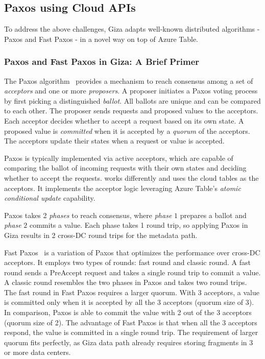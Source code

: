 \subsection{Paxos using Cloud APIs}

To address the above challenges, Giza adapts well-known distributed algorithms
- Paxos and Fast Paxos - in a novel way on top of Azure Table.

\subsubsection{Paxos and Fast Paxos in Giza: A Brief Primer}

The Paxos algorithm~\cite{lamport01paxos} provides a mechanism to reach
consensus among a set of {\em acceptors} and one or more {\em proposers}.
A proposer initiates a Paxos voting process by first picking a distinguished {\em
  ballot}. All ballots are unique and can be compared to each other. The
proposer sends requests and proposed values to the acceptors.
Each acceptor decides whether to accept a request based on its
own state. A proposed value is {\em committed} when it is accepted by a {\em
  quorum} of the acceptors. The acceptors update their states when a request or
value is accepted.

Paxos is typically implemented via active acceptors, which are
capable of comparing the ballot of incoming requests with their own states and
deciding whether to accept the requests.
\name works differently and uses the cloud tables as the acceptors.
It implements the acceptor logic leveraging Azure Table's {\em atomic conditional update} capability.

Paxos takes 2 {\em phases} to reach consensus, where {\em phase} $1$ prepares
a ballot and {\em phase} $2$ commits a value. Each phase takes 1 round trip,
so applying Paxos in Giza results in 2 cross-DC round trips for the metadata
path.


Fast Paxos~\cite{lamport05fast} is a variation of Paxos that optimizes the
performance over cross-DC acceptors. It employs two types of rounds: fast round
and classic round. A fast round sends a PreAccept request and takes a single
round trip to commit a value. A classic round resembles the two phases in Paxos
and takes two round trips. The fast round in Fast Paxos requires a larger quorum.
With $3$ acceptors,
a value is committed only when it is accepted by all the 3 acceptors (quorum size of 3).
In comparison, Paxos is able to commit the value with 2 out of the 3 acceptors (quorum size of 2).
The advantage of Fast Paxos is that when all the 3 acceptors respond, the value is committed
in a single round trip. The requirement of larger quorum fits \name perfectly,
as Giza data path already requires storing fragments in 3 or more data centers.

